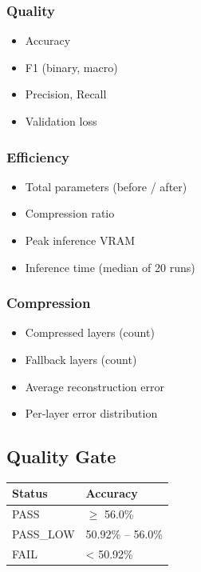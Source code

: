 \subsubsection{Quality}

\begin{itemize}
\item Accuracy
\item F1 (binary, macro)
\item Precision, Recall
\item Validation loss

\end{itemize}
\subsubsection{Efficiency}

\begin{itemize}
\item Total parameters (before / after)
\item Compression ratio
\item Peak inference VRAM
\item Inference time (median of 20 runs)

\end{itemize}
\subsubsection{Compression}

\begin{itemize}
\item Compressed layers (count)
\item Fallback layers (count)
\item Average reconstruction error
\item Per-layer error distribution

\end{itemize}
\subsection{Quality Gate}

\begin{table}[H]
\centering
\small
\begin{tabular}{ll}
\toprule
\textbf{Status} & \textbf{Accuracy} \\
\midrule
PASS & $\ge$ 56.0\% \\
PASS\_LOW & 50.92\% -- 56.0\% \\
FAIL & < 50.92\% \\
\bottomrule
\end{tabular}
\end{table}


